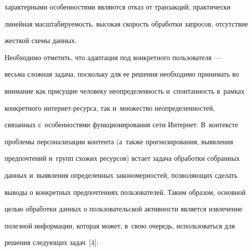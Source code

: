 характерными особенностями являются отказ от транзакций, практически 


линейная масштабируемость, высокая скорость обработки запросов, отсутствие 


жесткой схемы данных. 


  


  Необходимо отметить, что адаптация под конкретного пользователя~--- 


весьма сложная задача, поскольку для ее решения необходимо принимать во 


внимание как присущие человеку неопределенность и~спонтанность в~рамках 


конкретного ин\-тер\-нет-ре\-сур\-са, так и~множество неопределенностей, 


связанных с~особенностями функционирования сети Интернет. В~контексте 


проблемы персонализации контента (а~также прогнозирования, выявления 


предпочтений и~групп схожих ресурсов) встает задача обработки собранных 


данных и~выявления определенных закономерностей, позволяющих сделать 


выводы о конкретных предпочтениях пользователей. Таким образом, основной 


целью обработки данных о пользовательской активности является извлечение 


полезной информации, которая может, в~свою очередь, использоваться для 


решения следующих задач~[4]:


